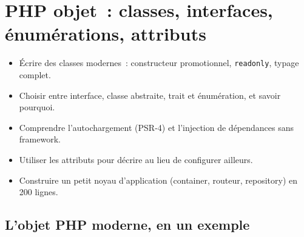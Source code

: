 \chapter{PHP objet~: classes, interfaces, \'enum\'erations, attributs}
\label{ch-php-oop}

\begin{objectif}
\begin{itemize}
  \item \'Ecrire des classes modernes~: constructeur promotionnel, \verb|readonly|, typage complet.
  \item Choisir entre interface, classe abstraite, trait et \'enum\'eration, et savoir pourquoi.
  \item Comprendre l'autochargement (PSR-4) et l'injection de d\'ependances sans framework.
  \item Utiliser les attributs pour d\'ecrire au lieu de configurer ailleurs.
  \item Construire un petit noyau d'application (container, routeur, repository) en 200 lignes.
\end{itemize}
\end{objectif}

\section{L'objet PHP moderne, en un exemple}

